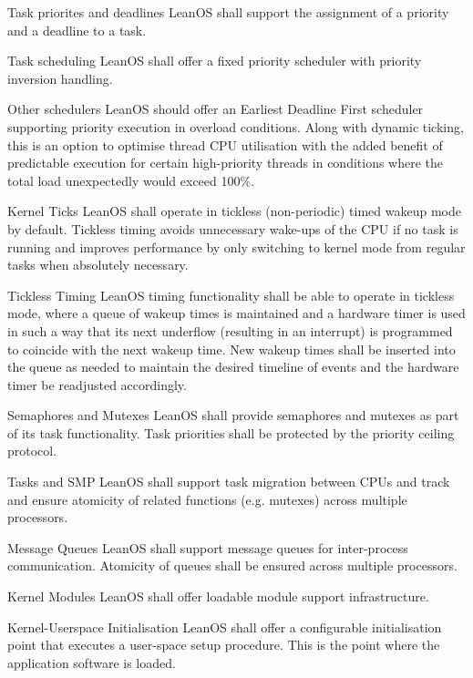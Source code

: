  {Task priorites and deadlines}{%
LeanOS shall support the assignment of a priority and a deadline to a task.
}{}%

 {Task scheduling}{%
LeanOS shall offer a fixed priority scheduler with priority inversion handling.
}{}%

 {Other schedulers}{%
LeanOS should offer an Earliest Deadline First scheduler supporting priority
execution in overload conditions.
}{%
Along with dynamic ticking, this is an option to optimise thread CPU utilisation
with the added benefit of predictable execution for certain high-priority
threads in conditions where the total load unexpectedly would exceed 100\%.
}%

 {Kernel Ticks}{%
LeanOS shall operate in tickless (non-periodic) timed wakeup mode by default.
}{%
Tickless timing avoids unnecessary wake-ups of the CPU if no task is running
and improves performance by only switching to kernel mode from regular tasks
when absolutely necessary.
}%

 {Tickless Timing}{%
LeanOS timing functionality shall be able to operate in tickless mode, where 
a queue of wakeup times is maintained and a hardware timer is used in such a way
that its next underflow (resulting in an interrupt) is programmed to coincide
with the next wakeup time. New wakeup times shall be inserted into the queue as
needed to maintain the desired timeline of events and the hardware timer
be readjusted accordingly.
}{}%

 {Semaphores and Mutexes}{%
LeanOS shall provide semaphores and mutexes as part of its task functionality.
Task priorities shall be protected by the priority ceiling protocol.
}{}%

 {Tasks and \gls{SMP}}{%
LeanOS shall support task migration between \glspl{CPU} and track and ensure
atomicity of related functions (e.g. mutexes) across multiple processors.
}{}%

 {Message Queues}{%
LeanOS shall support message queues for inter-process communication.
Atomicity of queues shall be ensured across multiple processors.
}{}%

 {Kernel Modules}{%
LeanOS shall offer loadable module support infrastructure.
}{}%

 {Kernel-Userspace Initialisation}{%
LeanOS shall offer a configurable initialisation point that executes a
user-space setup procedure.
}{This is the point where the application software is loaded.}%

